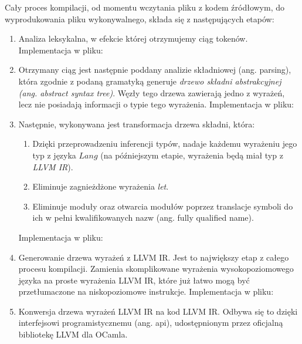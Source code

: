 \documentclass[declaration,shortabstract]{iithesis}
\begin{document}
Cały proces kompilacji, od momentu wczytania pliku z kodem źródłowym, do 
wyprodukowania pliku wykonywalnego, składa się z następujących etapów:
\begin{enumerate}
  \item Analiza leksykalna, w efekcie której otrzymujemy ciąg tokenów. 
  Implementacja w pliku: 

  \item Otrzymany ciąg jest następnie poddany analizie składniowej 
  (ang. parsing), która zgodnie z podaną gramatyką generuje \textit{drzewo 
  składni abstrakcyjnej (ang. abstract syntax tree)}. Węzły tego drzewa 
  zawierają jedno z wyrażeń, lecz nie posiadają informacji o typie tego
  wyrażenia. Implementacja w pliku: \newline
 
  \item Następnie, wykonywana jest transformacja drzewa składni, która:

  \begin{enumerate}
    \item Dzięki przeprowadzeniu inferencji typów, nadaje każdemu wyrażeniu jego typ z języka $Lang$ (na późniejszym etapie, wyrażenia będą miał typ 
    z \textit{LLVM IR}). 
    \item Eliminuje zagnieżdżone wyrażenia \textit{let}.
    \item Eliminuje moduły oraz otwarcia modułów poprzez translacje symboli do 
    ich w pełni kwalifikowanych nazw (ang. fully qualified name).
  \end{enumerate}
  Implementacja w pliku: 

  \item Generowanie drzewa wyrażeń z LLVM IR. Jest to największy etap z całego 
  procesu kompilacji. Zamienia skomplikowane wyrażenia wysokopoziomowego języka
  na proste wyrażenia LLVM IR, które już łatwo mogą być przetłumaczone na 
  niskopoziomowe instrukcje.
  Implementacja w pliku: 

  \item Konwersja drzewa wyrażeń LLVM IR na kod LLVM IR. Odbywa się to dzięki 
  interfejsowi programistycznemu (ang. api), udostępnionym przez oficjalną 
  bibliotekę LLVM dla OCamla.

\end{enumerate}
\end{document}
